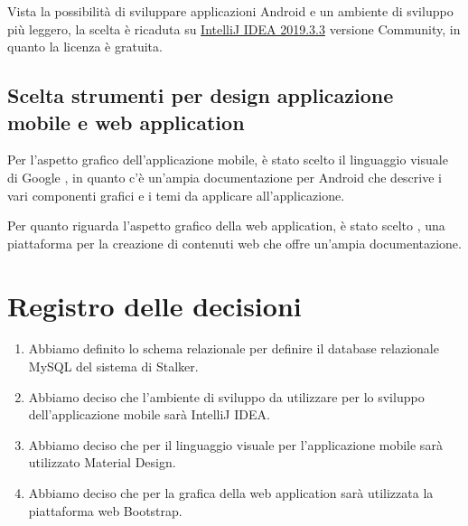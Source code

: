 \documentclass{article}
\begin{document}
Vista la possibilità di sviluppare applicazioni Android e un ambiente di sviluppo più leggero, la scelta è ricaduta su \href{https://www.jetbrains.com/help/idea/getting-started-with-android-development.html}{IntelliJ IDEA 2019.3.3} versione Community, in quanto la licenza è gratuita.

\subsection{Scelta strumenti per design applicazione mobile e web application}%
\label{sub:scelta_strumenti_per_design_applicazione_mobile_e_web_application}
Per l'aspetto grafico dell'applicazione mobile, è stato scelto il linguaggio visuale di Google \href{https://material.io/develop/android}{}, in quanto c'è un'ampia documentazione per Android che descrive i vari componenti grafici e i temi da applicare all'applicazione.

Per quanto riguarda l'aspetto grafico della web application, è stato scelto \href{https://getbootstrap.com/}{}, una piattaforma per la creazione di contenuti web che offre un'ampia documentazione.



\newpage
\section{Registro delle decisioni}%
\label{sec:registro_delle_decisioni}

\begin{enumerate}
  \item Abbiamo definito lo schema relazionale per definire il database relazionale MySQL del sistema di Stalker.
  \item Abbiamo deciso che l'ambiente di sviluppo da utilizzare per lo sviluppo dell'applicazione mobile sarà IntelliJ IDEA\@.
  \item Abbiamo deciso che per il linguaggio visuale per l'applicazione mobile sarà utilizzato Material Design.
  \item Abbiamo deciso che per la grafica della web application sarà utilizzata la piattaforma web Bootstrap.
\end{enumerate}

\end{document}
